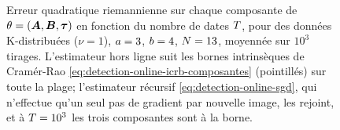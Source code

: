 %
%
\begin{figure}[htbp]
  \centering
  
  \provMseIcrbQR[1cm]
  \caption{Erreur quadratique riemannienne sur chaque composante de
  $\theta=(\boldsymbol{A},\boldsymbol{B},\boldsymbol{\tau})$ en fonction du nombre de
  dates $T$, pour des données K-distribuées ($\nu=1$), $a=3$,
  $b=4$, $N=13$, moyennée sur $10^3$ tirages. L'estimateur hors
  ligne suit les bornes intrinsèques de Cramér-Rao
  \eqref{eq:detection-online-icrb-composantes} (pointillés) sur toute la plage;
  l'estimateur récursif \eqref{eq:detection-online-sgd}, qui n'effectue qu'un
  seul pas de gradient par nouvelle image, les rejoint, et à $T=10^3$ les
  trois composantes sont à la borne. \provMseIcrb}
  \label{fig:detection-online-mse-icrb}
\end{figure}

